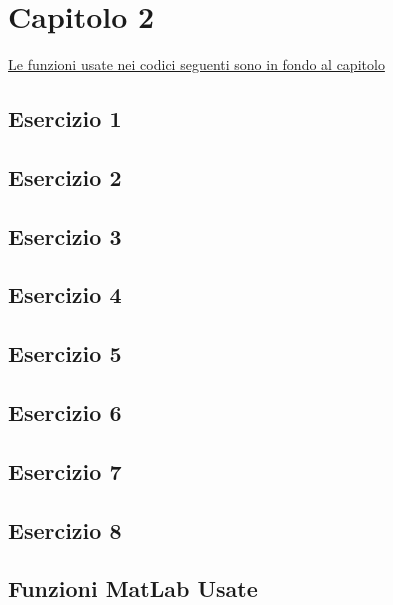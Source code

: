 \section{\textbf{Capitolo 2}}
\underline{Le funzioni usate nei codici seguenti sono in fondo al capitolo}
\subsection{Esercizio 1}

\subsection{Esercizio 2}

\subsection{Esercizio 3}

\newpage
\subsection{Esercizio 4}

\subsection{Esercizio 5}

\subsection{Esercizio 6}

\newpage
\subsection{Esercizio 7}

\newpage
\subsection{Esercizio 8}

\subsection{Funzioni MatLab Usate}
